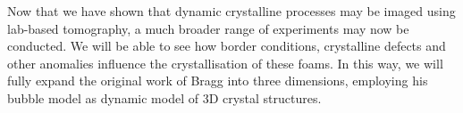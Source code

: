 \documentclass[10pt,a4paper]{article}
\begin{document}
Now that we have shown that dynamic crystalline processes may be imaged using lab-based tomography, a much broader range of experiments may now be conducted. We will be able to see how border conditions, crystalline defects and other anomalies influence the crystallisation of these foams. In this way, we will fully expand the original work of Bragg into three dimensions, employing his bubble model as dynamic model of 3D crystal structures. 




\end{document}
